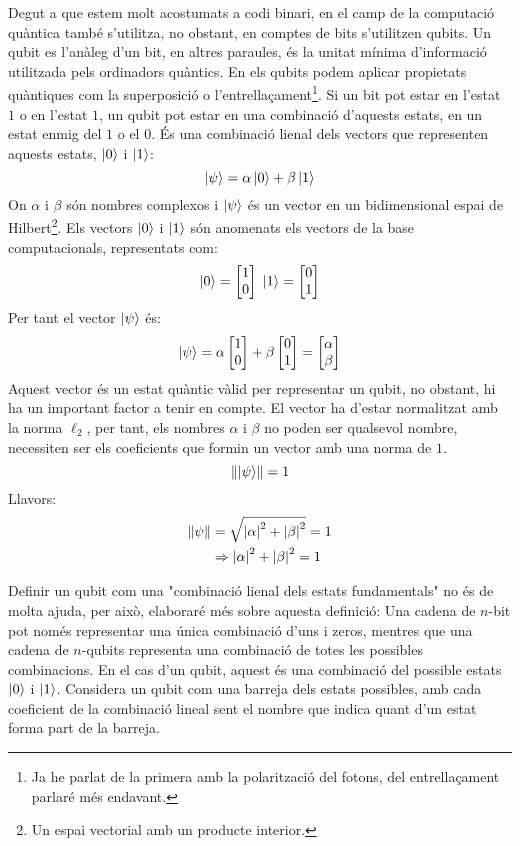 Degut a que estem molt acostumats a codi binari, en el camp de la computació quàntica també s'utilitza, no obstant, en comptes de bits s'utilitzen qubits. Un qubit es l'anàleg d'un bit, en altres paraules, és la unitat mínima d'informació utilitzada pels ordinadors quàntics. En els qubits podem aplicar propietats quàntiques com la superposició o l'entrellaçament\footnote{Ja he parlat de la primera amb la polarització del fotons, del entrellaçament parlaré més endavant.}. Si un bit pot estar en l'estat $1$ o en l'estat $1$, un qubit pot estar en una combinació d'aquests estats, en un estat enmig del $1$ o el $0$. És una combinació lienal dels vectors que representen aquests estats, $\ket{0}$ i $\ket{1}$:
$$
\ket{\psi} = \alpha\ket{0} + \beta\ket{1}
$$
On $\alpha$ i $\beta$ són nombres complexos i $\ket{\psi}$ és un vector en un bidimensional espai de Hilbert\footnote{Un espai vectorial amb un producte interior.}. Els vectors $\ket{0}$ i $\ket{1}$ són anomenats els vectors de la base computacionals, representats com:
$$
\ket{0} = \begin{bmatrix}
	1 \\ 0
\end{bmatrix} \;
\ket{1} = \begin{bmatrix}
	0 \\ 1
\end{bmatrix}
$$
Per tant el vector $\ket{\psi}$ és:
$$
\ket{\psi} 
= \alpha 
\begin{bmatrix}
	1 \\ 0
\end{bmatrix} + \beta 
\begin{bmatrix}
0 \\ 1
\end{bmatrix}= 
\begin{bmatrix}
	\alpha \\ \beta
\end{bmatrix}
$$
Aquest vector és un estat quàntic vàlid per representar un qubit, no obstant, hi ha un important factor a tenir en compte. El vector ha d'estar normalitzat amb la norma $\ell_2$, per tant, els nombres $\alpha$ i $\beta$ no poden ser qualsevol nombre, necessiten ser els coeficients que formin un vector amb una norma de $1$.   
$$
\norm{\ket{\psi}} = 1 
$$
Llavors:
\begin{align*}
	\norm{\psi} &= \sqrt{\abs{\alpha}^2 + \abs{\beta}^2} = 1 \\
	&\Rightarrow \abs{\alpha}^2 + \abs{\beta}^2 = 1
\end{align*}

Definir un qubit com una "combinació lienal dels estats fundamentals" no és de molta ajuda, per això, elaboraré més sobre aquesta definició: 
Una cadena de $n$-bit pot només representar una única combinació d'uns i zeros, mentres que una cadena de $n$-qubits representa una combinació de totes les possibles combinacions. En el cas d'un qubit, aquest és una combinació del possible estats $\ket{0}$ i $\ket{1}$. Considera un qubit com una barreja dels estats possibles, amb cada coeficient de la combinació lineal sent el nombre que indica quant d'un estat forma part de la barreja. 

